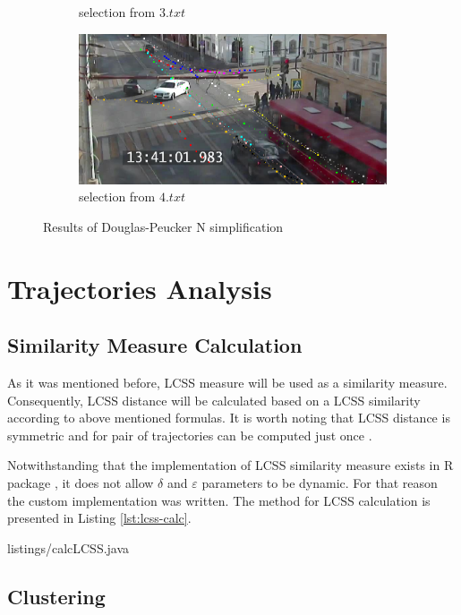 \begin{figure}[!htb]
\begin{subfigure}[!htb]{0.48\textwidth}
		\caption{selection from $3.txt$}
	\end{subfigure}
	\hfill
	\begin{subfigure}[!htb]{0.48\textwidth}
		\centering{}
		\includegraphics[width=\textwidth]{images/rdp-n-long-4.png}
		\caption{selection from $4.txt$}
	\end{subfigure}
	
	\caption{Results of Douglas-Peucker N simplification}
	\label{fig:rdp-n-res}
\end{figure}

\section{Trajectories Analysis}

\subsection{Similarity Measure Calculation}

As it was mentioned before, LCSS measure will be used as a similarity measure. Consequently, LCSS distance will be calculated based on a LCSS similarity according to above mentioned formulas. It is worth noting that LCSS distance is symmetric and for pair of trajectories can be computed just once \cite{inproceedings:28_lcss_dsmt}.

Notwithstanding that the implementation of LCSS similarity measure exists in R package \cite{online:r_lcss}, it does not allow $\delta$ and $\varepsilon$ parameters to be dynamic. For that reason the custom implementation was written. The method for LCSS calculation is presented in Listing \ref{lst:lcss-calc}. 

 {listings/calcLCSS.java}

\subsection{Clustering}

